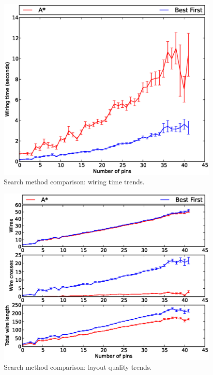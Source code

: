 \begin{figure}[H]
\begin{center}
\includegraphics[width=\textwidth]{Images/search_time_trend_comparison.eps}
\caption{Search method comparison: wiring time trends.}
\label{fig:search_time_trend}
\end{center}
\end{figure}

\begin{figure}[H]
\begin{center}
\includegraphics[width=\textwidth]{Images/search_quality_trend_comparison.eps}
\caption{Search method comparison: layout quality trends.}
\label{fig:search_quality_trend}
\end{center}
\end{figure}

